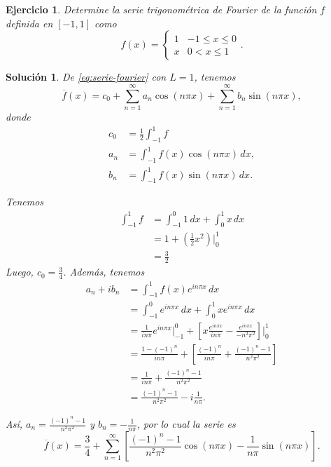 \documentclass[11pt,letterpaper,draft]{report}
\newtheorem{exe}[defn]{Ejercicio}
\newtheorem*{sol}{Solución}
\newcommand\<{\langle}
\renewcommand\>{\rangle}
\begin{document}
\begin{exe}\label{ejemplo-fourier}
  Determine la serie trigonométrica de Fourier de la función $f$
  definida en $[-1,1]$ como
  \[
    f(x) =
    \begin{cases}
      1 & -1\leq x\leq 0 \\
      x & 0<x\leq 1
    \end{cases}
  .\]
\end{exe}
\begin{sol}
  De \eqref{eq:serie-fourier} con $L=1$, tenemos
  \[
    \overline{f}(x) = c_0
    + \sum_{n=1}^\infty a_n\cos(n\pi x)
    + \sum_{n=1}^\infty b_n\sin(n\pi x)
  ,\]
  donde
  \begin{align*}
    c_0 &= \frac{1}{2}\int_{-1}^1 f \\
    a_n &= \int_{-1}^1 f(x)\cos(n\pi x)\,dx, \\
    b_n &= \int_{-1}^1 f(x)\sin(n\pi x)\,dx.
  \end{align*}

  Tenemos
  \begin{align*}
    \int_{-1}^{1}f
    &= \int_{-1}^{0}1\,dx + \int_{0}^{1}x\,dx \\
    &= 1 + \left( \frac{1}{2}x^{2} \right)\Big|_{0}^{1} \\
    &= \frac{3}{2}
  \end{align*}
  Luego, $c_0=\frac{3}{4}$.
  Además, tenemos
  \begin{align*}
    a_n+ib_n
    &= \int_{-1}^{1}f(x)e^{in\pi x}\,dx \\
    &= \int_{-1}^{0}e^{in\pi x}\,dx
     + \int_{0}^{1}xe^{in\pi x}\,dx \\
    &= \frac{1}{in\pi}e^{in\pi x}\Big|_{-1}^{0}
     + \left[
       x \frac{e^{in\pi x}}{in\pi}
       -
       \frac{e^{in\pi x}}{-n^{2}\pi^{2}}
     \right]\Big|_{0}^{1} \\
    &= \frac{1-(-1)^{n}}{in\pi}
     + \left[
       \frac{(-1)^{n}}{in\pi}
       + \frac{(-1)^{n}-1}{n^{2}\pi^{2}}
     \right] \\
    &= \frac{1}{in\pi}
     + \frac{(-1)^{n}-1}{n^{2}\pi^{2}} \\
    &=
     \frac{(-1)^{n}-1}{n^{2}\pi^{2}}
     -i \frac{1}{n\pi}.
  \end{align*}

  Así, $a_n=\frac{(-1)^{n}-1}{n^{2}\pi^{2}}$ y $b_n=-\frac{1}{n\pi}$,
  por lo cual la serie es
  \[
    \overline{f}(x)
    =
    \frac{3}{4}
    +
    \sum_{n=1}^{\infty}
    \left[
      \frac{(-1)^{n}-1}{n^{2}\pi^{2}}\cos(n\pi x)
      -\frac{1}{n\pi}\sin(n\pi x)
    \right]
  .\]
    
\end{sol}
\end{document}
